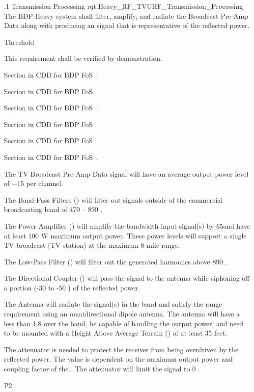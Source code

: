 
\ONERQMTV
{\RqtNumberBase.1}
{\ThisSubSegment Transmission Processing}
{rqt:Heavy_RF_TVUHF_Transmission_Processing}
{The BDP-Heavy system shall filter, amplify, and radiate the \TVUHF \RF Broadcast Pre-Amp Data along with producing an \RF signal that is representative of the reflected \RF power.}
{
	\item [Phase 1]  Threshold
}
{This requirement shall be verified by demonstration.}
{
	\item [5.1.1] Section in CDD for BDP FoS~\cite{ref__BDP_FOS_CDD}.
	\item [5.1.2] Section in CDD for BDP FoS~\cite{ref__BDP_FOS_CDD}.
	\item [5.1.4] Section in CDD for BDP FoS~\cite{ref__BDP_FOS_CDD}.
	\item [5.5.1] Section in CDD for BDP FoS~\cite{ref__BDP_FOS_CDD}.
	\item [5.5.3] Section in CDD for BDP FoS~\cite{ref__BDP_FOS_CDD}.
	\item [5.5.4] Section in CDD for BDP FoS~\cite{ref__BDP_FOS_CDD}.
}
{
	\item The TV \RF Broadcast Pre-Amp Data signal will have an average output power level of −15 \dBm per \RF channel.
	\item The Band-Pass Filters (\BPF) will filter out signals outside of the commercial \FM broadcasting band of 470 – 890 \MHz.
	\item The \RF Power Amplifier (\PA) will amplify the \TVUHF bandwidth input signal(s) by 65\dB and have at least 100 W maximum output power. These power levels will support a single TV broadcast (TV station) at the maximum 8-mile range.
	\item The Low-Pass Filter (\LPF) will filter out the generated harmonics above 890 \MHz.
	\item The Directional Coupler (\DC) will pass the \RF signal to the antenna while siphoning off a portion (-30 to -50 \dB) of the reflected power.
	\item The Antenna will radiate the \RF signal(s) in the \TVUHF band and satisfy the range requirement using an omnidirectional dipole antenna. The antenna will have a \VSWR less than 1.8 over the \TVUHF band, be capable of handling the \PA output power, and need to be mounted with a Height Above Average Terrain (\HAAT) of at least 35 feet.
	\item The attenuator is needed to protect the receiver from being overdriven by the reflected power. The value is dependent on the maximum \PA output power and coupling factor of the \DC. The attenuator will limit the signal to 0 \dBm.
}
{P2}

